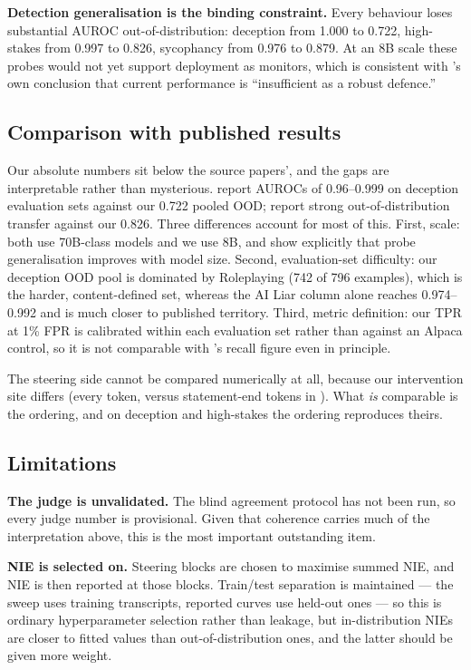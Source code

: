 \documentclass[conference]{IEEEtran}
\begin{document}
\textbf{Detection generalisation is the binding constraint.} Every behaviour
loses substantial AUROC out-of-distribution: deception from 1.000 to 0.722,
high-stakes from 0.997 to 0.826, sycophancy from 0.976 to 0.879. At an 8B scale
these probes would not yet support deployment as monitors, which is consistent
with \citeauthor{goldowsky2025}'s own conclusion that current performance is
``insufficient as a robust defence.''

\subsection{Comparison with published results}

Our absolute numbers sit below the source papers', and the gaps are interpretable
rather than mysterious. \citet{goldowsky2025} report AUROCs of 0.96--0.999 on
deception evaluation sets against our 0.722 pooled OOD; \citet{mckenzie2025}
report strong out-of-distribution transfer against our 0.826. Three differences
account for most of this. First, scale: both use 70B-class models and we use 8B,
and \citeauthor{marks2024} show explicitly that probe generalisation improves
with model size. Second, evaluation-set difficulty: our deception OOD pool is
dominated by Roleplaying (742 of 796 examples), which is the harder,
content-defined set, whereas the AI Liar column alone reaches 0.974--0.992 and
is much closer to published territory. Third, metric definition: our TPR at 1\%
FPR is calibrated within each evaluation set rather than against an Alpaca
control, so it is not comparable with \citeauthor{goldowsky2025}'s recall figure
even in principle.

The steering side cannot be compared numerically at all, because our
intervention site differs (every token, versus statement-end tokens in
\citeauthor{marks2024}). What \emph{is} comparable is the ordering, and on
deception and high-stakes the ordering reproduces theirs.

\subsection{Limitations}
\label{sec:limitations}

\textbf{The judge is unvalidated.} The blind agreement protocol has not been
run, so every judge number is provisional. Given that coherence carries much of
the interpretation above, this is the most important outstanding item.

\textbf{NIE is selected on.} Steering blocks are chosen to maximise summed NIE,
and NIE is then reported at those blocks. Train/test separation is maintained
--- the sweep uses training transcripts, reported curves use held-out ones ---
so this is ordinary hyperparameter selection rather than leakage, but
in-distribution NIEs are closer to fitted values than out-of-distribution ones,
and the latter should be given more weight.
\end{document}

